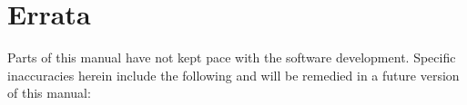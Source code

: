 \chapter*{Errata}

Parts of this manual have not kept pace with the software development.
Specific inaccuracies herein include the following and will be remedied in
a future version of this manual:
\begin{itemize}




\end{itemize}

\thispagestyle{empty}

\newpage
